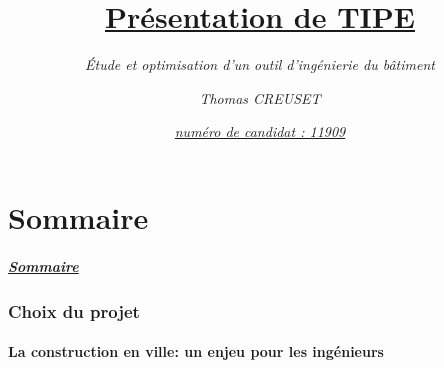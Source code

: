 \documentclass[10pt]{beamer}
\author{\textit{Thomas CREUSET}}
\title{\uline{Pr\'esentation de TIPE}}
\subtitle{\textit{\'Etude et optimisation d’un outil d'ing\'enierie du b\^atiment}}
\date{\underline{\textit{num\'ero de candidat : 11909}}}
\begin{document}
	\frame{\titlepage}

	\part{Sommaire}
	\begin{frame}
		\frametitle{\uline{Sommaire}}
		\tableofcontents
	\end{frame}

	\section{Choix du projet}
	\subsection{La construction en ville: un enjeu pour les ing\'enieurs}
\end{document}
